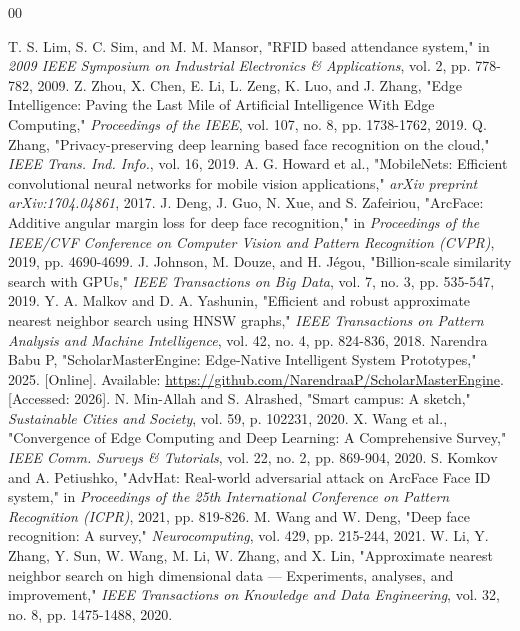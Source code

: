 \documentclass[conference]{IEEEtran}
\begin{document}
\begin{thebibliography}{00}

 T. S. Lim, S. C. Sim, and M. M. Mansor, "RFID based attendance system," in \textit{2009 IEEE Symposium on Industrial Electronics \& Applications}, vol. 2, pp. 778-782, 2009.
 Z. Zhou, X. Chen, E. Li, L. Zeng, K. Luo, and J. Zhang, "Edge Intelligence: Paving the Last Mile of Artificial Intelligence With Edge Computing," \textit{Proceedings of the IEEE}, vol. 107, no. 8, pp. 1738-1762, 2019.
 Q. Zhang, "Privacy-preserving deep learning based face recognition on the cloud," \textit{IEEE Trans. Ind. Info.}, vol. 16, 2019.
 A. G. Howard et al., "MobileNets: Efficient convolutional neural networks for mobile vision applications," \textit{arXiv preprint arXiv:1704.04861}, 2017.
 J. Deng, J. Guo, N. Xue, and S. Zafeiriou, "ArcFace: Additive angular margin loss for deep face recognition," in \textit{Proceedings of the IEEE/CVF Conference on Computer Vision and Pattern Recognition (CVPR)}, 2019, pp. 4690-4699.
 J. Johnson, M. Douze, and H. Jégou, "Billion-scale similarity search with GPUs," \textit{IEEE Transactions on Big Data}, vol. 7, no. 3, pp. 535-547, 2019.
 Y. A. Malkov and D. A. Yashunin, "Efficient and robust approximate nearest neighbor search using HNSW graphs," \textit{IEEE Transactions on Pattern Analysis and Machine Intelligence}, vol. 42, no. 4, pp. 824-836, 2018.
 Narendra Babu P, "ScholarMasterEngine: Edge-Native Intelligent System Prototypes," 2025. [Online]. Available: \url{https://github.com/NarendraaP/ScholarMasterEngine}. [Accessed: 2026].
 N. Min-Allah and S. Alrashed, "Smart campus: A sketch," \textit{Sustainable Cities and Society}, vol. 59, p. 102231, 2020.
 X. Wang et al., "Convergence of Edge Computing and Deep Learning: A Comprehensive Survey," \textit{IEEE Comm. Surveys \& Tutorials}, vol. 22, no. 2, pp. 869-904, 2020.
 S. Komkov and A. Petiushko, "AdvHat: Real-world adversarial attack on ArcFace Face ID system," in \textit{Proceedings of the 25th International Conference on Pattern Recognition (ICPR)}, 2021, pp. 819-826.
 M. Wang and W. Deng, "Deep face recognition: A survey," \textit{Neurocomputing}, vol. 429, pp. 215-244, 2021.
 W. Li, Y. Zhang, Y. Sun, W. Wang, M. Li, W. Zhang, and X. Lin, "Approximate nearest neighbor search on high dimensional data — Experiments, analyses, and improvement," \textit{IEEE Transactions on Knowledge and Data Engineering}, vol. 32, no. 8, pp. 1475-1488, 2020.

\end{thebibliography}
\end{document}
